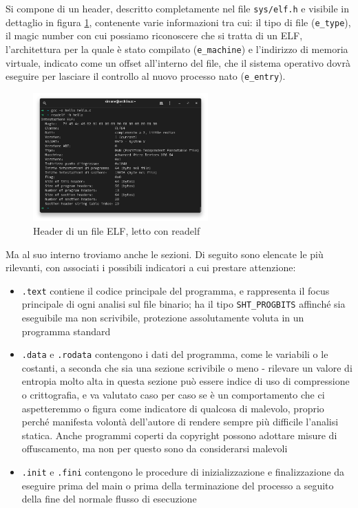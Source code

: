 Si compone di un header, descritto completamente nel file \texttt{sys/elf.h} e visibile in dettaglio in figura \ref{fig:elf_header}, contenente varie informazioni tra cui: il tipo di file (\texttt{e\_type}), il magic number con cui possiamo riconoscere che si tratta di un ELF,
l'architettura per la quale è stato compilato (\texttt{e\_machine})
e l'indirizzo di memoria virtuale, indicato come un offset all'interno del file, che il sistema operativo dovrà eseguire per lasciare il controllo al nuovo processo nato (\texttt{e\_entry}).

\begin{figure}[htbp]
    \centering
    \includegraphics[width=0.6\textwidth]{assets/elf_header.png}
    \caption{Header di un file ELF, letto con readelf}
    \label{fig:elf_header}
\end{figure}

Ma al suo interno troviamo anche le sezioni. Di seguito sono elencate le più rilevanti, con associati i possibili indicatori a cui prestare attenzione: \cite{forensic_friday_execs}
\begin{itemize}
    \item \texttt{.text} contiene il codice principale del programma, e rappresenta il focus principale di ogni analisi sul file binario; ha il tipo \texttt{SHT\_PROGBITS} affinché sia eseguibile ma non scrivibile, protezione assolutamente voluta in un programma standard
    \item \texttt{.data} e \texttt{.rodata} contengono i dati del programma, come le variabili o le costanti, a seconda che sia una sezione scrivibile o meno - rilevare un valore di entropia molto alta in questa sezione può essere indice di uso di compressione o crittografia, e va valutato caso per caso se è un comportamento che ci aspetteremmo o figura come indicatore di qualcosa di malevolo, proprio perché manifesta volontà dell'autore di rendere sempre più difficile l'analisi statica. Anche programmi coperti da copyright possono adottare misure di offuscamento, ma non per questo sono da considerarsi malevoli
    \item \texttt{.init} e \texttt{.fini} contengono le procedure di inizializzazione e finalizzazione da eseguire prima del main o prima della terminazione del processo a seguito della fine del normale flusso di esecuzione
\end{itemize}

